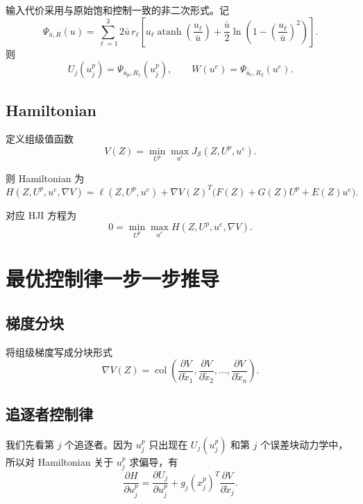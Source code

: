 \documentclass[12pt,a4paper]{ctexart}
\begin{document}
输入代价采用与原始饱和控制一致的非二次形式。记
\begin{equation}
\Psi_{\bar u,R}(u)
=
\sum_{\ell=1}^{3}
2\bar u\, r_\ell
\left[
u_\ell\operatorname{atanh}\!\left(\frac{u_\ell}{\bar u}\right)
+
\frac{\bar u}{2}\ln\!\left(1-\left(\frac{u_\ell}{\bar u}\right)^2\right)
\right].
\end{equation}
则
\begin{equation}
U_j(u_j^p)=\Psi_{\bar u_p,R_1}(u_j^p),
\qquad
W(u^e)=\Psi_{\bar u_e,R_2}(u^e).
\end{equation}

\subsection{Hamiltonian}

定义组级值函数
\begin{equation}
V(Z)=\min_{U^p}\max_{u^e}J_{\mathcal S}(Z,U^p,u^e).
\end{equation}

则 Hamiltonian 为
\begin{equation}
H(Z,U^p,u^e,\nabla V)
=
\ell(Z,U^p,u^e)+\nabla V(Z)^T\big(F(Z)+G(Z)U^p+E(Z)u^e\big).
\end{equation}

对应 HJI 方程为
\begin{equation}
0=\min_{U^p}\max_{u^e}H(Z,U^p,u^e,\nabla V).
\end{equation}

\section{最优控制律一步一步推导}

\subsection{梯度分块}

将组级梯度写成分块形式
\begin{equation}
\nabla V(Z)
=
\operatorname{col}\!\left(
\frac{\partial V}{\partial \tilde x_1},
\frac{\partial V}{\partial \tilde x_2},
\dots,
\frac{\partial V}{\partial \tilde x_n}
\right).
\end{equation}

\subsection{追逐者控制律}

我们先看第 $j$ 个追逐者。因为 $u_j^p$ 只出现在 $U_j(u_j^p)$ 和第 $j$ 个误差块动力学中，所以对 Hamiltonian 关于 $u_j^p$ 求偏导，有
\begin{equation}
\frac{\partial H}{\partial u_j^p}
=
\frac{\partial U_j}{\partial u_j^p}
+
g_j(x_j^p)^T\frac{\partial V}{\partial \tilde x_j}.
\end{equation}
\end{document}
